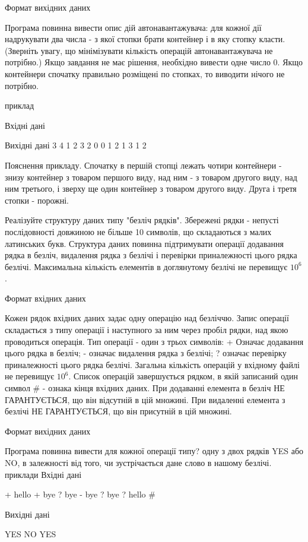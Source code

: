 \documentclass[]{article}
\begin{document}
Формат вихідних даних

Програма повинна вивести опис дій автонавантажувача: для кожної дії надрукувати два числа - з якої стопки брати контейнер і в яку стопку класти. (Зверніть увагу, що мінімізувати кількість операцій автонавантажувача не потрібно.) Якщо завдання не має рішення, необхідно вивести одне число 0. Якщо контейнери спочатку правильно розміщені по стопках, то виводити нічого не потрібно.

приклад

Вхідні дані


Вихідні дані
3
4 1 2 3 2
0
0 1 2
1 3
1 2

Пояснення прикладу. Спочатку в першій стопці лежать чотири контейнери - знизу контейнер з товаром першого виду, над ним - з товаром другого виду, над ним третього, і зверху ще один контейнер з товаром другого виду. Друга і третя стопки - порожні.

Реалізуйте структуру даних типу "безліч рядків". Збережені рядки - непусті послідовності довжиною не більше 10 символів, що складаються з малих латинських букв.
Структура даних повинна підтримувати операції додавання рядка в безліч, видалення рядка з безлічі і перевірки приналежності цього рядка безлічі.
Максимальна кількість елементів в доглянутому безлічі не перевищує $10^6$.

Формат вхідних даних

Кожен рядок вхідних даних задає одну операцію над безліччю. Запис операції складається з типу операції і наступного за ним через пробіл рядки, над якою проводиться операція.
Тип операції - один з трьох символів:
    + Означає додавання цього рядка в безліч;
    - означає видалення рядка з безлічі;
    ? означає перевірку приналежності цього рядка безлічі.
Загальна кількість операцій у вхідному файлі не перевищує $10^6$. Список операцій завершується рядком, в якій записаний один символ 
\# - ознака кінця вхідних даних.
При додаванні елемента в безліч НЕ ГАРАНТУЄТЬСЯ, що він відсутній в цій множині. При видаленні елемента з безлічі НЕ ГАРАНТУЄТЬСЯ, що він присутній в цій множині.

Формат вихідних даних

Програма повинна вивести для кожної операції типу? одну з двох рядків YES або NO, в залежності від того, чи зустрічається дане слово в нашому безлічі.
приклади
Вхідні дані

+ hello
+ bye
? bye
- bye
? bye
? hello
\#

Вихідні дані

YES
NO
YES
\end{document}
